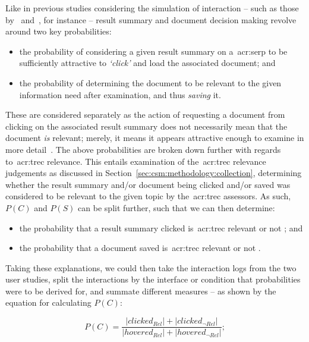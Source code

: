 Like in previous studies considering the simulation of interaction -- such as those by~\cite{yilmaz2010browsing_utility} and~\cite{baskaya2013behavioural_factors}, for instance -- result summary and document decision making revolve around two key probabilities:

\begin{itemize}
    \item{the probability  of considering a given result summary on a~\gls{acr:serp} to be sufficiently attractive to \emph{`click'} and load the associated document; and}
    \item{the probability  of determining the document to be relevant to the given information need after examination, and thus \emph{saving} it.}
\end{itemize}

These are considered separately as the action of requesting a document from clicking on the associated result summary does not necessarily mean that the document \emph{is} relevant; merely, it means it appears attractive enough to examine in more detail~\citep{turpin2009summaries}. The above probabilities are broken down further with regards to~\gls{acr:trec} relevance. This entails examination of the~\gls{acr:trec} relevance judgements as discussed in Section~\ref{sec:csm:methodology:collection}, determining whether the result summary and/or document being clicked and/or saved was considered to be relevant to the given topic by the~\gls{acr:trec} assessors. As such, $P(C)$ and $P(S)$ can be split further, such that we can then determine:

\begin{itemize}
    \item{the probability that a result summary clicked is~\gls{acr:trec} relevant  or not ; and}
    \item{the probability that a document saved is~\gls{acr:trec} relevant  or not .}
\end{itemize}

Taking these explanations, we could then take the interaction logs from the two user studies, split the interactions by the interface or condition that probabilities were to be derived for, and summate different measures -- as shown by the equation for calculating $P(C)$:

\begin{equation*}
    P(C) = \frac{|clicked_{Rel}| + |clicked_{\neg Rel}|}{|hovered_{Rel}| + |hovered_{\neg Rel}|};
\end{equation*}

